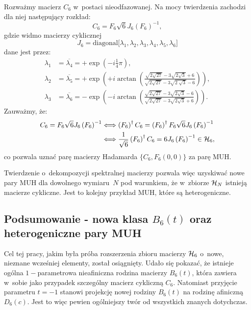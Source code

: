 \documentclass[a4paper,12pt,twoside]{article}
\newcommand{\HADAMARDS}[1]{{\cal H}_{#1}}
\begin{document}
Rozwa\.{z}my macierz $C_6$ w~postaci nieodfazowanej. Na mocy twierdzenia zachodzi dla niej nast\k{e}puj\k{a}cy rozk{\l}ad:
\begin{equation}
C_6 = F_6 \sqrt{6} J_6\left(F_6\right)^{-1},
\end{equation}
gdzie widmo macierzy cyklicznej
\begin{equation}
    J_6 = \textrm{diagonal}\big[\lambda_1, \lambda_2, \lambda_3, \lambda_4, \lambda_5, \lambda_6\big]
\end{equation}
dane jest przez:
\begin{align*}
\lambda_1&=\overline{\lambda_4}=+\exp\left(- i \frac{1}{4}\pi\right),\\
\lambda_2&=\overline{\lambda_5}=+\exp\left(+i\arctan\left(\frac{\sqrt{2 \sqrt{27}}-3\sqrt{2\sqrt{3}}+6}
{\sqrt{2\sqrt{27}}-3\sqrt{2\;\sqrt{3}}-6}\right)\right),\\
\lambda_3&=\overline{\lambda_6}=-\exp\left(- i \arctan\left(\frac{\sqrt{2\sqrt{27}}-3\sqrt{2\sqrt{3}}-6}
{\sqrt{2\sqrt{27}}-3\sqrt{2 \sqrt{3}}+6}\right)\right).
\end{align*}
Zauwa\.{z}my, \.{z}e:
\begin{align*}
C_6 = F_6 \sqrt{6} J_6\left(F_6\right)^{-1}&\Longleftrightarrow
\left(F_6\right)^\dagger C_6 = \left(F_6\right)^\dagger F_6 \sqrt{6} J_6\left(F_6\right)^{-1}\\
&\Longleftrightarrow\frac{1}{\sqrt{6}}\left(F_6\right)^\dagger C_6 = 6 J_6\left(F_6\right)^{-1}\in\HADAMARDS{6},
\end{align*}
co pozwala uzna\'{c} par\k{e} macierzy Hadamarda $\{C_6, F_6(0, 0)\}$ za par\k{e} MUH.

Twierdzenie o~dekompozycji spektralnej macierzy pozwala wi\k{e}c uzyskiwa\'{c} nowe pary MUH dla dowolnego wymiaru~$N$ pod warunkiem, \.{z}e w~zbiorze $\HADAMARDS{N}$ istniej\k{a} macierze cykliczne. Jest to kolejny przyk{\l}ad MUH, kt\'{o}re s\k{a} heterogeniczne.


\subsection*{Podsumowanie - nowa klasa $B_6(t)$ oraz heterogeniczne pary MUH}

Cel tej pracy, jakim by{\l}a pr\'{o}ba rozszerzenia zbioru macierzy $\HADAMARDS{6}$ o~nowe, nieznane wcze\'{s}niej elementy, zosta{\l} osi\k{a}gni\k{e}ty. Uda{\l}o si\k{e} pokaza\'{c}, \.{z}e istnieje og\'{o}lna $1-$parametrowa nie\-a\-fi\-nicz\-na rodzina macierzy $B_6(t)$, kt\'{o}ra zawiera w~sobie jako przypadek szczeg\'{o}lny macierz cykliczn\k{a} $C_6$. Natomiast przyj\k{e}cie parametru $t=-1$ stanowi projekcj\k{e} nowej rodziny $B_6(t)$ na rodzin\k{e} afiniczn\k{a} $D_6(c)$. Jest to wi\k{e}c pewien og\'{o}lniejszy tw\'{o}r od wszystkich znanych do\-tych\-czas.
\end{document}

